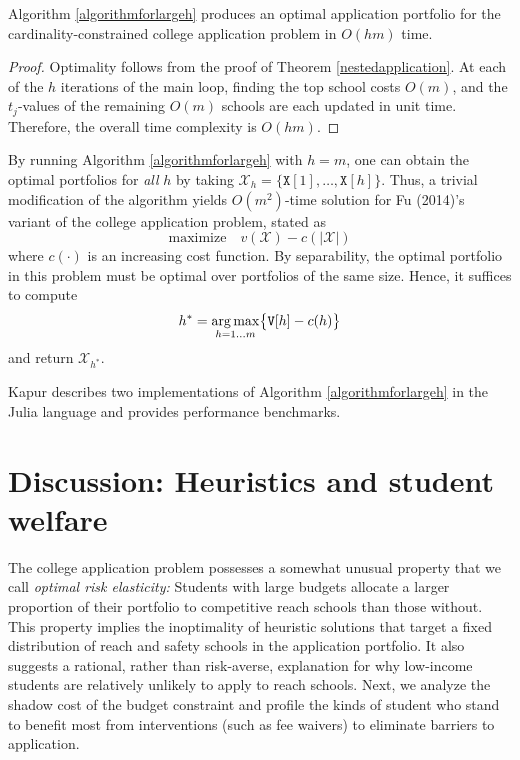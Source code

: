 \begin{theorem} \label{validityofalmaalgorithm}
Algorithm \ref{algorithmforlargeh} produces an optimal application portfolio for the cardinality-constrained college application problem in $O(h m)$ time.
\end{theorem}

\begin{proof}
Optimality follows from the proof of Theorem \ref{nestedapplication}. At each of the $h$ iterations of the main loop, finding the top school costs $O(m)$, and the $t_j$-values of the remaining $O(m)$ schools are each updated in unit time. Therefore, the overall time complexity is $O(h m)$.
\end{proof}

By running Algorithm \ref{algorithmforlargeh} with $h = m$, one can obtain the optimal portfolios for \emph{all} $h$ by taking $\mathcal{X}_h = \{ \mathtt{X}[1], \dots, \mathtt{X}[h]\}$. Thus, a trivial modification of the algorithm yields $O(m^2)$-time solution for Fu (2014)'s variant of the college application problem, stated as 
\[ \text{maximize} \quad v(\mathcal{X}) - c(|\mathcal{X}|)\]
where $c(\cdot)$ is an increasing cost function. By separability, the optimal portfolio in this problem must be optimal over portfolios of the same size. Hence, it suffices to compute
\[h^* = \operatorname*{arg\,max}_{h = 1 \dots m} \bigl\{\mathtt{V}[h] - c(h)\bigr\}\] and return $\mathcal{X}_{h^*}$.  

Kapur \cite{kapur2022} describes two implementations of Algorithm \ref{algorithmforlargeh} in the Julia language and provides performance benchmarks.





\section{Discussion: Heuristics and student welfare} \label{sectionDiscussion}

The college application problem possesses a somewhat unusual property that we call \emph{optimal risk elasticity:} Students with large budgets allocate a larger proportion of their portfolio to competitive reach schools than those without. This property implies the inoptimality of heuristic solutions that target a fixed distribution of reach and safety schools in the application portfolio. It also suggests a rational, rather than risk-averse, explanation for why low-income students are relatively unlikely to apply to reach schools. Next, we analyze the shadow cost of the budget constraint and profile the kinds of student who stand to benefit most from interventions (such as fee waivers) to eliminate barriers to application.

